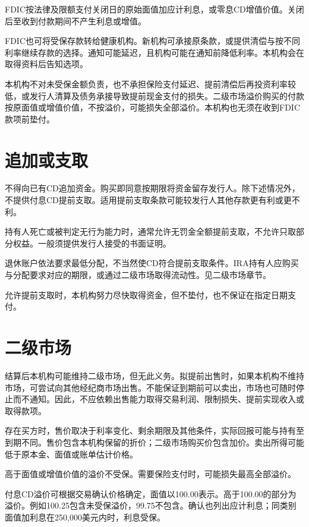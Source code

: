 \documentclass[UTF8,fontset=none,11pt,a4paper]{ctexart}
\begin{document}
FDIC按法律及限额支付关闭日的原始面值加应计利息，或零息CD增值价值。关闭后至收到付款期间不产生利\allowbreak\mbox{息或增值。}


FDIC也可将受保存款转给健康机构。新机构可承接原条款，或提供清偿与按不同利率继续存款的选择。通知可能延迟，且机构可能在通知前降低利率。本机构会在取得资料后\allowbreak\mbox{告知选项。}


本机构不对未受保金额负责，也不承担保险支付延迟、提前清偿后再投资利率较低，或发行人清算及债务承接导致提前现金支付的损失。二级市场溢价购买的付款按原面值或增值价值，不按溢价，可能损失全部溢价。本机构也无须在收到FDIC款\allowbreak\mbox{项前垫付。}


\section*{追加或支取}
不得向已有CD追加资金。购买即同意按期限将资金留存发行人。除下述情况外，不提供付息CD提前支取。适用提前支取条款可能较发行人其他存款更有利\allowbreak\mbox{或更不利。}


持有人死亡或被判定无行为能力时，通常允许无罚金全额提前支取，不允许只取部分权益。一般须提供发行人接受的\allowbreak\mbox{书面证明。}


退休账户依法要求最低分配，不当然使CD符合提前支取条件。IRA持有人应购买与分配要求对应的期限，或通过二级市场取得流动性。见二级\allowbreak\mbox{市场章节。}


允许提前支取时，本机构努力尽快取得资金，但不垫付，也不保证在指定\allowbreak\mbox{日期支付。}


\section*{二级市场}
结算后本机构可能维持二级市场，但无此义务。拟提前出售时，如果本机构不维持市场，可尝试向其他经纪商市场出售。不能保证到期前可以卖出，市场也可随时停止而不通知。因此，不应依赖出售能力取得交易利润、限制损失、提前实现收入或\allowbreak\mbox{取得款项。}


存在买方时，售价取决于利率变化、剩余期限及其他条件，实际回报可能与持有至到期不同。售价包含本机构保留的折价；二级市场购买价包含加价。卖出所得可能低于原本金、面值或账单\allowbreak\mbox{估计价格。}


高于面值或增值价值的溢价不受保。需要保险支付时，可能损失最高\allowbreak\mbox{全部溢价。}


付息CD溢价可根据交易确认价格确定，面值以100.00表示。高于100.00的部分为溢价。例如100.25包含未受保溢价，99.75不包含。确认也列出应计利息；同类别面值加利息在250,000美元内时，\allowbreak\mbox{利息受保。}
\end{document}
